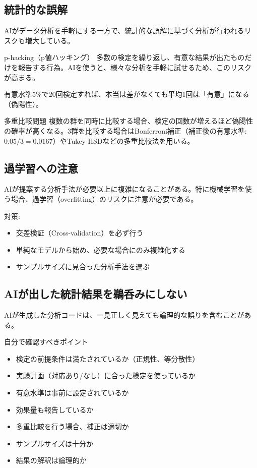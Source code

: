 \subsection{統計的な誤解}

AIがデータ分析を手軽にする一方で、統計的な誤解に基づく分析が行われるリスクも増大している。

\begin{itembox}[l]{p-hacking（p値ハッキング）}
多数の検定を繰り返し、有意な結果が出たものだけを報告する行為。AIを使うと、様々な分析を手軽に試せるため、このリスクが高まる。

有意水準5\%で20回検定すれば、本当は差がなくても平均1回は「有意」になる（偽陽性）。
\end{itembox}

\begin{itembox}[l]{多重比較問題}
複数の群を同時に比較する場合、検定の回数が増えるほど偽陽性の確率が高くなる。3群を比較する場合はBonferroni補正（補正後の有意水準: $0.05 / 3 = 0.0167$）やTukey HSDなどの多重比較法を用いる。
\end{itembox}

\subsection{過学習への注意}

AIが提案する分析手法が必要以上に複雑になることがある。特に機械学習を使う場合、過学習（overfitting）のリスクに注意が必要である。

対策:
\begin{itemize}
\item 交差検証（Cross-validation）を必ず行う
\item 単純なモデルから始め、必要な場合にのみ複雑化する
\item サンプルサイズに見合った分析手法を選ぶ
\end{itemize}

\subsection{AIが出した統計結果を鵜呑みにしない}

AIが生成した分析コードは、一見正しく見えても論理的な誤りを含むことがある。

\begin{itembox}[l]{自分で確認すべきポイント}
\begin{itemize}
\item 検定の前提条件は満たされているか（正規性、等分散性）
\item 実験計画（対応あり/なし）に合った検定を使っているか
\item 有意水準は事前に設定されているか
\item 効果量も報告しているか
\item 多重比較を行う場合、補正は適切か
\item サンプルサイズは十分か
\item 結果の解釈は論理的か
\end{itemize}
\end{itembox}

